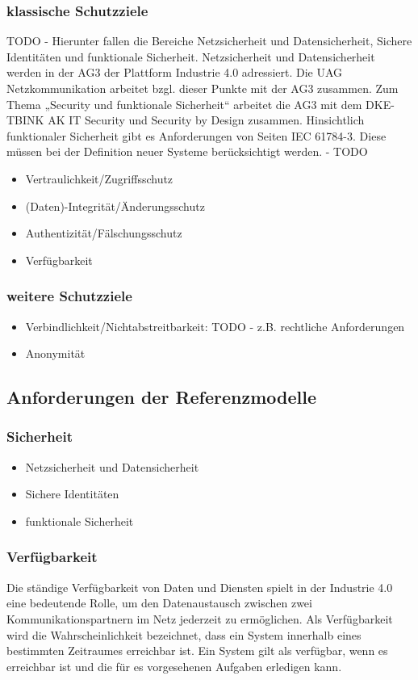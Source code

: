 \subsubsection{klassische Schutzziele}
TODO - Hierunter fallen die Bereiche Netzsicherheit und Datensicherheit, Sichere Identitäten und funktionale Sicherheit. Netzsicherheit und Datensicherheit werden in der AG3 der Plattform Industrie 4.0 adressiert. Die UAG Netzkommunikation arbeitet bzgl. dieser Punkte mit der AG3 zusammen. Zum Thema „Security und funktionale Sicherheit“ arbeitet die AG3 mit dem DKE-TBINK AK IT Security und Security by Design zusammen. Hinsichtlich funktionaler Sicherheit gibt es Anforderungen von Seiten IEC 61784-3. Diese müssen bei der Definition neuer Systeme berücksichtigt werden. - TODO

\begin{itemize}
  \item Vertraulichkeit/Zugriffsschutz
  \item (Daten)-Integrität/Änderungsschutz
  \item Authentizität/Fälschungsschutz
  \item Verfügbarkeit
\end{itemize}

\subsubsection{weitere Schutzziele}
\begin{itemize}
  \item Verbindlichkeit/Nichtabstreitbarkeit: TODO - z.B. rechtliche Anforderungen
  \item Anonymität
\end{itemize}

\subsection{Anforderungen der Referenzmodelle}
\subsubsection{Sicherheit}
\begin{itemize}
    \item Netzsicherheit und Datensicherheit
    \item Sichere Identitäten
    \item funktionale Sicherheit
\end{itemize}

\subsubsection{Verfügbarkeit}
Die ständige Verfügbarkeit von Daten und Diensten spielt in der Industrie 4.0 eine bedeutende Rolle, um den Datenaustausch zwischen zwei Kommunikationspartnern im Netz jederzeit zu ermöglichen. Als Verfügbarkeit wird die Wahrscheinlichkeit bezeichnet, dass ein System innerhalb eines bestimmten Zeitraumes erreichbar ist. Ein System gilt als verfügbar, wenn es erreichbar ist und die für es vorgesehenen Aufgaben erledigen kann.

